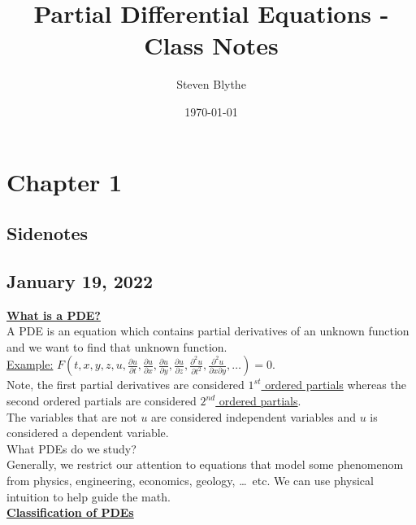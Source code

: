 \documentclass{article}
\title{Partial Differential Equations - Class Notes}
\date{\today}
\author{Steven Blythe}
\newcommand{\topic}[1]{\textbf{\underline{#1}}}
\newcommand{\Ex}{\underline{Example:} }
\begin{document}
\maketitle
\newpage
\section{Chapter 1}
\subsection*{Sidenotes}
\subsection{January 19, 2022}
\topic{What is a PDE?}\\
A PDE is an equation which contains partial derivatives of an unknown function and we want to find that unknown function.\\
\Ex $F(t, x, y, z, u, \frac{\partial u}{\partial t}, \frac{\partial u}{\partial x}, \frac{\partial u}{\partial y}, \frac{\partial u}{\partial z}, \frac{\partial^2 u}{\partial t^2}, \frac{\partial^2 u}{\partial x \partial y}, \ldots) = 0$.\\
Note, the first partial derivatives are considered \underline{$1^{st}$ ordered partials}
whereas the second ordered partials are considered \underline{$2^{nd}$ ordered partials}.\\
The variables that are not $u$ are considered independent variables and $u$ is considered a dependent variable.\\
What PDEs do we study?\\
Generally, we restrict our attention to equations that model some phenomenom from physics, engineering, economics, geology, \ldots\ etc. We can use physical intuition to help guide the math.\\
\topic{Classification of PDEs}
\end{document}
